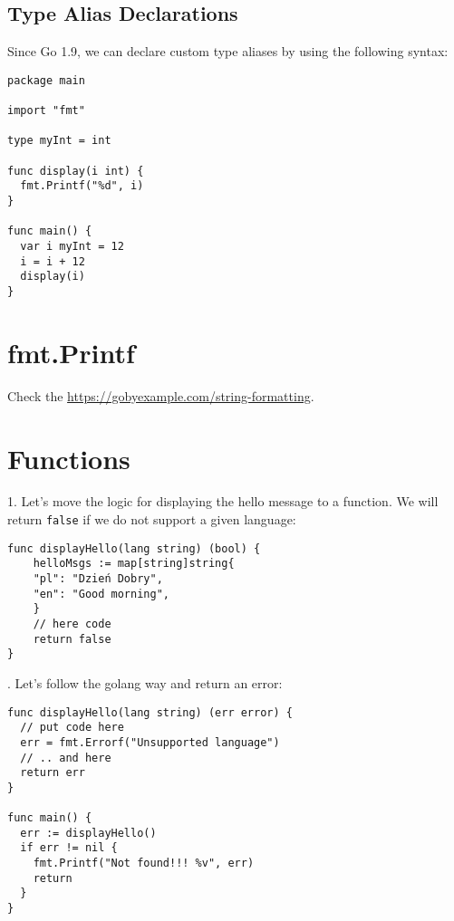 \documentclass[11pt, letterpaper]{article}
\begin{document}
\subsection{Type Alias Declarations}

Since Go 1.9, we can declare custom type aliases by using the following syntax:

\begin{verbatim}
package main

import "fmt"

type myInt = int

func display(i int) {
  fmt.Printf("%d", i)
}

func main() {
  var i myInt = 12
  i = i + 12
  display(i)
}
\end{verbatim}

\section{fmt.Printf}

Check the \href{https://gobyexample.com/string-formatting}{https://gobyexample.com/string-formatting}.

\section{Functions}

1. Let's move the logic for displaying the hello message to a function. We will return \verb|false| if we do not support a given language:

\begin{verbatim}
func displayHello(lang string) (bool) {
    helloMsgs := map[string]string{
    "pl": "Dzień Dobry",
    "en": "Good morning",
    }
    // here code
    return false
}
\end{verbatim}

. Let's follow the golang way and return an error:

\begin{verbatim}
func displayHello(lang string) (err error) {
  // put code here
  err = fmt.Errorf("Unsupported language")
  // .. and here
  return err
}

func main() {
  err := displayHello()
  if err != nil {
    fmt.Printf("Not found!!! %v", err)
    return
  }
}
\end{verbatim}
\end{document}
